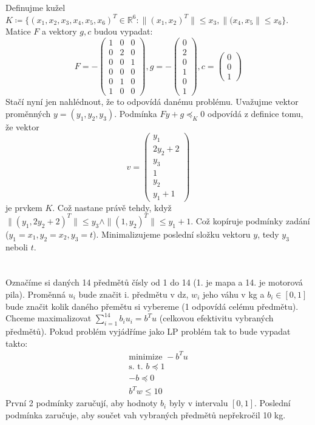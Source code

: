 \documentclass[12pt, a4paper]{article}
\begin{document}
\section{}
Definujme kužel $K \coloneqq \{(x_1,x_2,x_3,x_4,x_5,x_6)^T \in \mathbb{R}^6: \|(x_1,x_2)^T\| \leq x_3, \|(x_4,x_5\| \leq x_6\}$. Matice $F$ a vektory $g, c$ budou vypadat:
\[
F = -\begin{pmatrix}
1 & 0 & 0 \\
0 & 2 & 0 \\
0 & 0 & 1 \\
0 & 0 & 0 \\
0 & 1 & 0 \\
1 & 0 & 0
\end{pmatrix},
g = -\begin{pmatrix}
0 \\
2 \\
0 \\
1 \\
0 \\
1
\end{pmatrix},
c = \begin{pmatrix}
0\\
0\\
1
\end{pmatrix}
\]
Stačí nyní jen nahlédnout, že to odpovídá danému problému. Uvažujme vektor proměnných $y = (y_1, y_2, y_3)$. Podmínka $Fy+g \preceq_K 0$ odpovídá z definice tomu, že vektor
\[
v = \begin{pmatrix}
y_1 \\
2y_2 + 2\\
y_3\\
1\\
y_2\\
y_1+1
\end{pmatrix}
\]
je prvkem $K$. Což nastane právě tehdy, když $\|(y_1,2y_2+2)^T\|\leq y_3 \land \|(1,y_2)^T\| \leq y_1+1$. Což kopíruje podmínky zadání ($y_1 = x_1, y_2 = x_2, y_3 = t$). Minimalizujeme poslední složku vektoru $y$, tedy $y_3$ neboli $t$.

\section{}
Označíme si daných 14 předmětů čísly od 1 do 14 (1. je mapa a 14. je motorová pila). Proměnná $u_i$ bude značit  i. předmětu v dz, $w_i$ jeho váhu v kg a $b_i \in [0,1]$ bude značit kolik daného přemětu si vybereme (1 odpovídá celému předmětu). Chceme maximalizovat $\sum_{i=1}^{14} b_i u_i = b^T u$ (celkovou efektivitu vybraných předmětů). Pokud problém vyjádříme jako LP problém tak to bude vypadat takto:
\begin{gather*}
\text{minimize } -b^T u\\
\text{s. t. } b \preceq 1\\
-b \preceq 0\\
b^T w \leq 10
\end{gather*}
První 2 podmínky zaručují, aby hodnoty $b_i$ byly v intervalu $[0,1]$. Poslední podmínka zaručuje, aby součet vah vybraných předmětů nepřekročil 10 kg.
\end{document}
